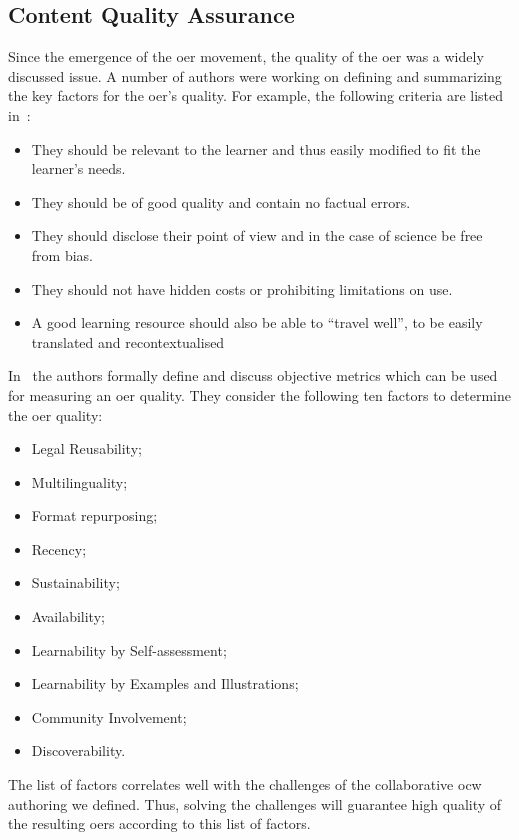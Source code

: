 \documentclass[PhD, Submit, ngerman,UKenglish,table]{scrbook}
\begin{document}
\subsection{Content Quality Assurance}

Since the emergence of the \gls{oer} movement, the quality of the \gls{oer} was a widely discussed issue.
A number of authors were working on defining and summarizing the key factors for the \gls{oer}'s quality.
For example, the following criteria are listed in~\cite{travelwell, Leinonen2010}:
\begin{itemize}
\item They should be relevant to the learner and thus easily modified to fit the learner's needs.
\item They should be of good quality and contain no factual errors.
\item They should disclose their point of view and in the case of science be free from bias.
\item They should not have hidden costs or prohibiting limitations on use.
\item A good learning resource should also be able to ``travel well'', to be easily translated and recontextualised
\end{itemize}

In~\cite{sahar_vahdati_2015_14756} the authors formally define and discuss objective metrics which can be used for measuring an \gls{oer} quality. 
They consider the following ten factors to determine the \gls{oer} quality:
\begin{itemize}
\item Legal Reusability;
\item Multilinguality;
\item Format repurposing;
\item Recency;
\item Sustainability;
\item Availability;
\item Learnability by Self-assessment;
\item Learnability by Examples and Illustrations;
\item Community Involvement;
\item Discoverability.
\end{itemize}

The list of factors correlates well with the challenges of the collaborative \gls{ocw} authoring we defined. 
Thus, solving the challenges will guarantee high quality of the resulting \gls{oer}s according to this list of factors.
\end{document}
